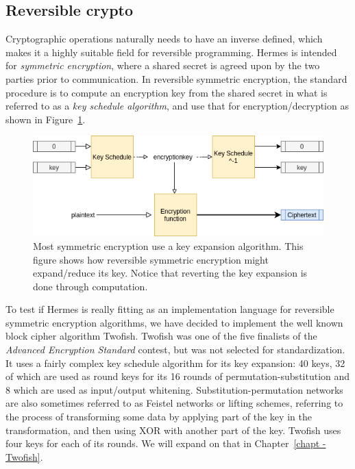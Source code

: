 \subsection{Reversible crypto}
Cryptographic operations naturally needs to have an inverse defined, which makes it a highly suitable field for reversible programming.
Hermes is intended for \emph{symmetric encryption}, where a shared secret is agreed upon by the two parties prior to communication.
In reversible symmetric encryption, the standard procedure is to compute an encryption key from the shared secret in what is referred to as a \emph{key schedule algorithm}, and use that for encryption/decryption as shown in Figure~\ref{fig:reversible_crypto}.
\begin{figure}[tp]
  \centering
  \includegraphics[scale=0.6]{Graphics/asymmetric_crypto.png}
  \caption{Most symmetric encryption use a key expansion algorithm. This figure shows how reversible symmetric encryption might expand/reduce its key. Notice that reverting the key expansion is done through computation.}
  \label{fig:reversible_crypto}
\end{figure}

To test if Hermes is really fitting as an implementation language for reversible symmetric encryption algorithms, we have decided to implement the well known block cipher algorithm Twofish.
Twofish was one of the five finalists of the \emph{Advanced Encryption Standard}\cite{wiki_AES} contest, but was not selected for standardization.
It uses a fairly complex key schedule algorithm for its key expansion: 40 keys, 32 of which are used as round keys for its 16 rounds of permutation-substitution and 8 which are used as input/output whitening.
Substitution-permutation networks are also sometimes referred to as Feistel networks or lifting schemes, referring to the process of transforming some data by applying part of the key in the transformation, and then using XOR with another part of the key.
Twofish uses four keys for each of its rounds.
We will expand on that in Chapter~\ref{chapt - Twofish}.

